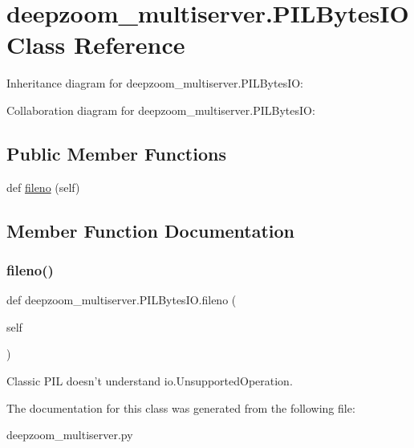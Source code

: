 \hypertarget{classdeepzoom__multiserver_1_1PILBytesIO}{}\section{deepzoom\+\_\+multiserver.\+P\+I\+L\+Bytes\+IO Class Reference}
\label{classdeepzoom__multiserver_1_1PILBytesIO}


Inheritance diagram for deepzoom\+\_\+multiserver.\+P\+I\+L\+Bytes\+IO\+:


Collaboration diagram for deepzoom\+\_\+multiserver.\+P\+I\+L\+Bytes\+IO\+:
\subsection*{Public Member Functions}
\begin{DoxyCompactItemize}
\item 
def \hyperlink{classdeepzoom__multiserver_1_1PILBytesIO_af1ba067e64261f75969bf4b5fd4fd99b}{fileno} (self)
\end{DoxyCompactItemize}


\subsection{Member Function Documentation}
\mbox{\label{classdeepzoom__multiserver_1_1PILBytesIO_af1ba067e64261f75969bf4b5fd4fd99b}} 
\subsubsection{\texorpdfstring{fileno()}{fileno()}}
{\footnotesize\ttfamily def deepzoom\+\_\+multiserver.\+P\+I\+L\+Bytes\+I\+O.\+fileno (\begin{DoxyParamCaption}\item[{}]{self }\end{DoxyParamCaption})}

\begin{DoxyVerb}Classic PIL doesn't understand io.UnsupportedOperation.\end{DoxyVerb}
 

The documentation for this class was generated from the following file\+:\begin{DoxyCompactItemize}
\item 
deepzoom\+\_\+multiserver.\+py\end{DoxyCompactItemize}
